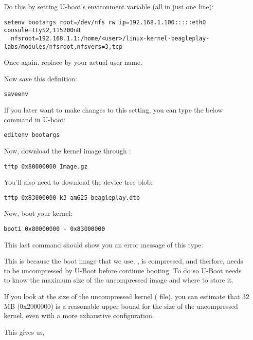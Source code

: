 Do this by setting U-boot's  environment variable (all in
just one line):

\begin{verbatim}
setenv bootargs root=/dev/nfs rw ip=192.168.1.100:::::eth0 console=ttyS2,115200n8
  nfsroot=192.168.1.1:/home/<user>/linux-kernel-beagleplay-labs/modules/nfsroot,nfsvers=3,tcp
\end{verbatim}

Once again, replace  by your actual user name.

Now save this definition:
\begin{verbatim}
saveenv
\end{verbatim}

If you later want to make changes to this setting, you can type the
below command in U-boot:

\begin{verbatim}
editenv bootargs
\end{verbatim}

Now, download the kernel image through :

\begin{verbatim}
tftp 0x80000000 Image.gz
\end{verbatim}

You'll also need to download the device tree blob:

\begin{verbatim}
tftp 0x83000000 k3-am625-beagleplay.dtb
\end{verbatim}

Now, boot your kernel:

\begin{verbatim}
booti 0x80000000 - 0x83000000
\end{verbatim}

This last command should show you an error message of this type:

This is because the boot image that we use, , is compressed, and
therfore, needs to be uncompressed by U-Boot before continue booting. To do so
U-Boot needs to know the maximum size of the uncompressed image and where to
store it.

If you look at the size of the uncompressed kernel ( file),
you can estimate that 32 MB (0x2000000) is a reasonable upper bound
for the size of the uncompressed kernel, even with a more exhaustive
configuration.

This gives us,

